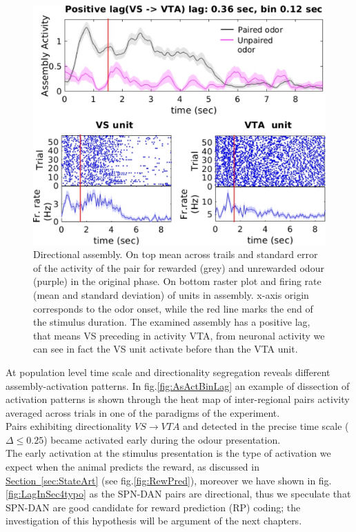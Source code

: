 \begin{figure}
    \centering
    \includegraphics[scale=0.6]{figures/DirectionalAsEx1.pdf}
    \caption{Directional assembly. On top mean across trails and standard error of the activity of the pair for rewarded (grey) and unrewarded odour (purple) in the original phase. On bottom raster plot and firing rate (mean and standard deviation) of units in assembly. x-axis origin corresponds to the odor onset, while the red line marks the end of the stimulus duration. The examined assembly has a positive lag, that means VS preceding in activity VTA, from neuronal activity we can see in fact the VS unit activate before than the VTA unit.}
    \label{fig:directional_assembly}
\end{figure}
At population level time scale and directionality segregation reveals different assembly-activation patterns. In fig.\ref{fig:AsActBinLag} an example of dissection of activation patterns is shown through the heat map of inter-regional pairs activity averaged across trials in one of the paradigms of the experiment.\\Pairs exhibiting directionality $VS \rightarrow VTA$ and detected in the precise time scale ($\Delta \le 0.25$) became activated early during the odour presentation.\\The early activation at the stimulus presentation is the type of activation we expect when the animal predicts the reward, as discussed in \hyperref[sec:StateArt]{Section~\ref*{sec:StateArt}} (see fig.\ref{fig:RewPred}), moreover we have shown in fig.\ref{fig:LagInSec4typo} as the SPN-DAN pairs are directional, thus we speculate that SPN-DAN are good candidate for reward prediction (RP) coding; the investigation of this hypothesis will be argument of the next chapters.\\
